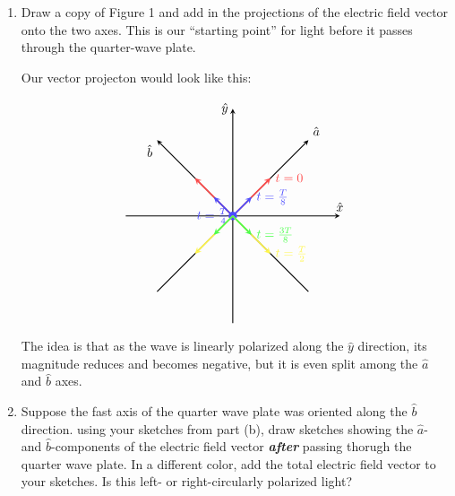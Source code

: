 \documentclass{article}
\begin{document}
\begin{enumerate}[resume, label=\alph*)]
    \item Draw a copy of Figure 1 and add in the projections of the electric field vector onto the two axes. This is our ``starting point'' for light before it passes through the quarter-wave plate. 
    
    \begin{solution}
        Our vector projecton would look like this: 

        $$\begin{tikzpicture}[scale=1.5]
            \draw[thick, -stealth] (0,-2) -- (0,2) node[anchor=east] {$\hat{y}$};
            \draw[thick, -stealth] (-2,0) -- (2,0) node[anchor=south] {$\hat{x}$};
            \draw[thick,-stealth] (-1.414,-1.414) -- (1.414,1.414) node[anchor=south west] {$\hat{a}$};
            \draw[thick,-stealth] (1.414,-1.414) -- (-1.414,1.414) node[anchor=north east] {$\hat{b}$};
            \draw[very thick, -stealth, red!70] (0,0) -- (0.707,0.707) node[anchor=west] {$t=0$};
            \draw[very thick, -stealth, red!70] (0,0) -- (-0.707,0.707);
            \draw[very thick, -stealth, blue!70] (0,0) -- (0.353,0.353) node[anchor=west] {$t = \frac{T}{8}$};
            \draw[very thick, -stealth, blue!70] (0,0) -- (-0.353,0.353);
            \filldraw[blue!70] (0,0) circle (0.075cm) node[anchor=east] {$t = \frac{T}{4}$};
            \draw[very thick, -stealth, yellow!70] (0,0) -- (0.707,-0.707) node[anchor=west] {$t = \frac{T}{2}$};
            \draw[very thick, -stealth, yellow!70] (0,0) -- (-0.707,-0.707);
            \draw[very thick, -stealth, green!70] (0,0) -- (0.353,-0.353) node[anchor=west] {$t = \frac{3T}{8}$};
            \draw[very thick, -stealth, green!70] (0,0) -- (-0.353,-0.353);
        \end{tikzpicture}$$

        The idea is that as the wave is linearly polarized along the $\hat y$ direction, its magnitude reduces and becomes negative, but it is even split among the $\hat a$ and $\hat b$ axes.

    \end{solution}


    \item Suppose the fast axis of the quarter wave plate was oriented along the $\hat b$ direction. using your sketches from part (b), draw sketches showing the $\hat a$- and $\hat b$-components of the electric field vector \textbf{\textit{after}} passing thorugh the quarter wave plate. In a different color, add the total electric field vector to your sketches. Is this left- or right-circularly polarized light?


\end{enumerate}
\end{document}

